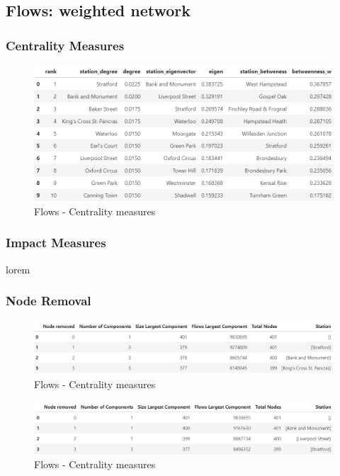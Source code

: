 \documentclass[10pt]{report}
\numberwithin{figure}{section}
\numberwithin{table}{section}
\begin{document}
\newpage

\subsection{Flows: weighted network} 

\subsubsection{Centrality Measures } 

    \begin{figure}[htp]
        \centering
        \includegraphics[width=14cm]{Image/Table_CentralitiesMeasures_Flows.png}
        \caption{Flows - Centrality measures}
        \label{fig:galaxy}
    \end{figure}


\subsubsection{Impact Measures} 
lorem

\subsubsection{Node Removal} 

    \begin{figure}[htp]
        \centering
        \includegraphics[width=14cm]{Image/Table_Flows_degree.png}
        \caption{Flows - Centrality measures}
        \label{fig:galaxy}
    \end{figure}

    \begin{figure}[htp]
        \centering
        \includegraphics[width=14cm]{Image/Table_Flows_eigenvector.png}
        \caption{Flows - Centrality measures}
        \label{fig:galaxy}
    \end{figure}
\end{document}
